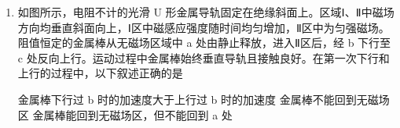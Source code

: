 \documentclass[\gkver]{gaokaozhenti}
\begin{document}
\begin{enumerate}
{	CD．热气球和物资的运动示意图如图所示


	热气球和物资所受合力大小均为 $mg$，所以热气球在竖直方向上加速度大小为 $a = \frac{m}{M}g$

	物资落地 $H$ 过程所用的时间 $t$ 内，根据 $H = \frac{1}{2}gt^{2}$ 解得落地时间为 $t = \sqrt{\frac{2H}{g}}$

	热气球在竖直方向上运动的位移为 $H_{M} = \frac{1}{2}at^{2} = \frac{1}{2} \cdot \frac{m}{M}g \cdot \frac{2H}{g} = \frac{m}{M}H$

	热气球和物资在水平方向均做匀速直线运动，水平位移为 $x_{m} = v_{0}t = v_{0}\sqrt{\frac{2H}{g}}$，$x_{M} = vt = \frac{m}{M}v_{0} \cdot \sqrt{\frac{2H}{g}}$

	根据勾股定理可知热气球和物资的实际位移为 $d = \sqrt{(x_{m} + x_{M})^{2} + (H + H_{M})^{2}} = \left(1 + \frac{m}{M}\right)\sqrt{\frac{2Hv_{0}^{2}}{g} + H^{2}}$

	C 正确，D 错误。

	故选 BC。
}

\item
如图所示，电阻不计的光滑 U 形金属导轨固定在绝缘斜面上。区域Ⅰ、Ⅱ中磁场方向均垂直斜面向上，Ⅰ区中磁感应强度随时间均匀增加，Ⅱ区中为匀强磁场。阻值恒定的金属棒从无磁场区域中 a 处由静止释放，进入Ⅱ区后，经 b 下行至 c 处反向上行。运动过程中金属棒始终垂直导轨且接触良好。在第一次下行和上行的过程中，以下叙述正确的是 


{金属棒下行过 b 时的加速度大于上行过 b 时的加速度}
{金属棒不能回到无磁场区}
{金属棒能回到无磁场区，但不能回到 a 处}

\end{enumerate}
\end{document}
